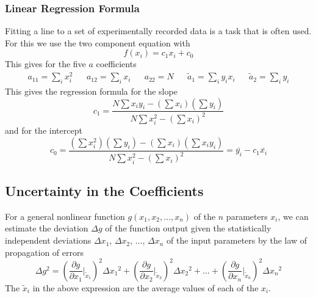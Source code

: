 \subsubsection{Linear Regression Formula}
Fitting a line to a set of experimentally recorded data is a task that is often used. For this we use the two component equation with
\begin{equation}
	f(x_i) = c_1 x_i + c_0
\end{equation}
This gives for the five $a$ coefficients
\begin{align}
	a_{11} = \sum_i x_i^2 && a_{12} = \sum_i x_i && a_{22}=N && \tilde{a}_1 = \sum_i y_i x_i && \tilde{a}_2 = \sum_i y_i
\end{align}
This gives the regression formula for the slope
\begin{equation}\label{append_linreg_slope}
	c_1 = \frac{N\sum x_i y_i - \left(\sum x_i\right)\left(\sum y_i\right)}{N\sum x_i^2 - \left(\sum x_i\right)^2}
\end{equation}
and for the intercept
\begin{equation}\label{append_linreg_interc}
	c_0 = \frac{\left(\sum x_i^2\right)\left(\sum y_i\right) - \left(\sum x_i\right)\left(\sum x_i y_i\right)}{N\sum x_i^2 - \left(\sum x_i\right)^2} = \bar{y_i} - c_1 \bar{x_i}
\end{equation}




\subsection{Uncertainty in the Coefficients}

For a general nonlinear function $g(x_1, x_2, \ldots, x_n)$ of the $n$ parameters $x_i$, we can estimate the deviation $\Delta g$ of the function output given the statistically independent deviations $\Delta x_1$, $\Delta {x_2}$, $\ldots$, $\Delta {x_n}$ of the input parameters by the law of propagation of errors \cite{stats_lawOfPropagationErrs}
\begin{equation} \label{append_error_prop}
	\Delta g^2 =
	\left(\frac{\partial g}{\partial x_1}\Bigg|_{\tilde{x}_1}\right)^2 \Delta {x_1}^2 +
	\left(\frac{\partial g}{\partial x_2}\Bigg|_{\tilde{x}_2}\right)^2 \Delta {x_2}^2 + \ldots +
	\left(\frac{\partial g}{\partial x_n}\Bigg|_{\tilde{x}_n}\right)^2 \Delta {x_n}^2
\end{equation}
The $\tilde{x}_i$ in the above expression are the average values of each of the $x_i$.

